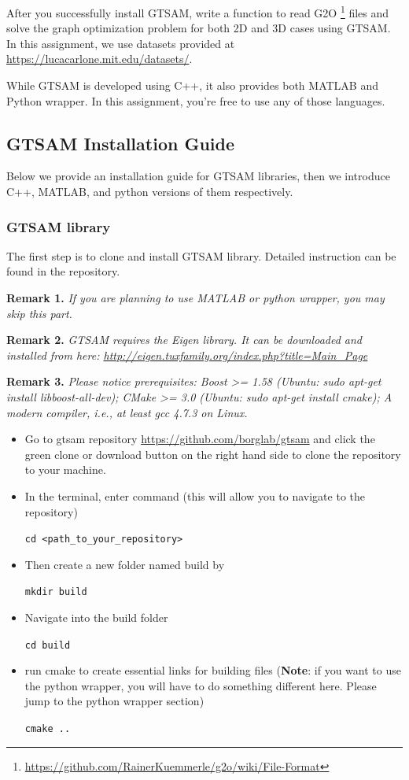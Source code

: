 \documentclass[tp]{lcc}
\begin{document}
After you successfully install GTSAM, write a function to read G2O \footnote{\url{https://github.com/RainerKuemmerle/g2o/wiki/File-Format}} files and solve the graph optimization problem for both 2D and 3D cases using GTSAM. In this assignment, we use datasets provided at \url{https://lucacarlone.mit.edu/datasets/}.

While GTSAM is developed using C++, it also provides both MATLAB and Python wrapper. In this assignment, you’re free to use any of those languages.

\subsection*{GTSAM Installation Guide}
Below we provide an installation guide for GTSAM libraries, then we introduce C++, MATLAB, and python versions of them respectively.

\subsubsection*{GTSAM library}
The first step is to clone and install GTSAM library. Detailed instruction can be found in the repository.

\textbf{Remark 1.} \textit{If you are planning to use MATLAB or python wrapper, you may skip this part.}

\textbf{Remark 2.} \textit{GTSAM requires the Eigen library. It can be downloaded and installed from here: \url{http://eigen.tuxfamily.org/index.php?title=Main_Page}}

\textbf{Remark 3.} \textit{Please notice prerequisites: Boost >= 1.58 (Ubuntu: sudo apt-get install libboost-all-dev); CMake >= 3.0 (Ubuntu: sudo apt-get install cmake); A modern compiler, i.e., at least gcc 4.7.3 on Linux.}

\begin{itemize}
    \item Go to gtsam repository \url{https://github.com/borglab/gtsam} and click the green clone or download button on the right hand side to clone the repository to your machine.
    \item In the terminal, enter command (this will allow you to navigate to the repository)
    
    \lstinline[style=bash]{cd <path_to_your_repository>}
    
    \item Then create a new folder named build by
    
    \lstinline[style=bash]{mkdir build}
    
    \item Navigate into the build folder
    
    \lstinline[style=bash]{cd build}
    
    \item run cmake to create essential links for building files (\textbf{Note}: if you want to use the python wrapper, you will have to do something different here. Please jump to the python wrapper section)
    
    \lstinline[style=bash]{cmake ..}
\end{itemize}
\end{document}
